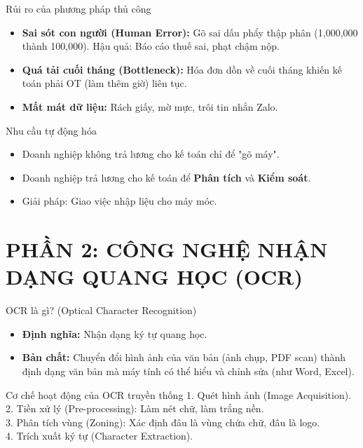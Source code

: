 \documentclass[aspectratio=169]{beamer}
\begin{document}
\begin{frame}{Rủi ro của phương pháp thủ công}
    \begin{itemize}
        \item \textbf{Sai sót con người (Human Error):} Gõ sai dấu phẩy thập phân (1,000,000 thành 100,000). Hậu quả: Báo cáo thuế sai, phạt chậm nộp.
        \item \textbf{Quá tải cuối tháng (Bottleneck):} Hóa đơn dồn về cuối tháng khiến kế toán phải OT (làm thêm giờ) liên tục.
        \item \textbf{Mất mát dữ liệu:} Rách giấy, mờ mực, trôi tin nhắn Zalo.
    \end{itemize}
\end{frame}


\begin{frame}{Nhu cầu tự động hóa}
    \begin{itemize}
        \item Doanh nghiệp không trả lương cho kế toán chỉ để "gõ máy".
        \item Doanh nghiệp trả lương cho kế toán để \textbf{Phân tích} và \textbf{Kiểm soát}.
        \item Giải pháp: Giao việc nhập liệu cho máy móc.
    \end{itemize}
\end{frame}


\section{PHẦN 2: CÔNG NGHỆ NHẬN DẠNG QUANG HỌC (OCR)}


\begin{frame}{OCR là gì? (Optical Character Recognition)}
    \begin{itemize}
        \item \textbf{Định nghĩa:} Nhận dạng ký tự quang học.
        \item \textbf{Bản chất:} Chuyển đổi hình ảnh của văn bản (ảnh chụp, PDF scan) thành định dạng văn bản mà máy tính có thể hiểu và chỉnh sửa (như Word, Excel).
    \end{itemize}
\end{frame}


\begin{frame}{Cơ chế hoạt động của OCR truyền thống}
    1. Quét hình ảnh (Image Acquisition).\\
    2. Tiền xử lý (Pre-processing): Làm nét chữ, làm trắng nền.\\
    3. Phân tích vùng (Zoning): Xác định đâu là vùng chứa chữ, đâu là logo.\\
    4. Trích xuất ký tự (Character Extraction).\\
\end{frame}
\end{document}
